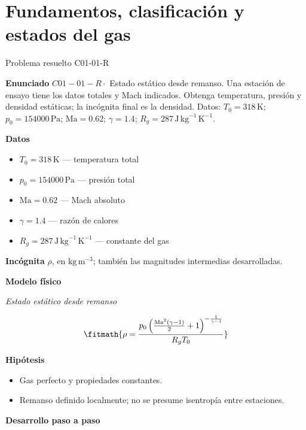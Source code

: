 \documentclass[10pt,openany]{book}
\begin{document}
\frontmatter
\studiumreadingguide
\tableofcontents
\mainmatter
\chapter{Fundamentos, clasificación y estados del gas}
\begin{studiumworked}{Problema resuelto C01-01-R}


\noindent\textbf{Enunciado}
\(C01-01-R \cdot\) Estado estático desde remanso. Una estación de ensayo tiene los datos totales y Mach indicados. Obtenga temperatura, presión y densidad estáticas; la incógnita final es la densidad. Datos: \(T_0=318\, \mathrm{K}\); \(p_0=154000\, \mathrm{Pa}\); \(\mathrm{Ma}=0.62\); \(\gamma=1.4\); \(R_g=287\, \mathrm{J}\,\mathrm{kg}^{-1}\,\mathrm{K}^{-1}\).

\noindent\textbf{Datos}
\begin{itemize}
\item $T_0 = 318\,\mathrm{K}$ — temperatura total
\item $p_0 = 154000\,\mathrm{Pa}$ — presión total
\item $\mathrm{Ma} = 0.62$ — Mach absoluto
\item $\gamma = 1.4$ — razón de calores
\item $R_g = 287\,\mathrm{J}\,\mathrm{kg}^{-1}\,\mathrm{K}^{-1}$ — constante del gas
\end{itemize}

\noindent\textbf{Incógnita}
$\rho$, en $\mathrm{kg\,m^{-3}}$; también las magnitudes intermedias desarrolladas.

\noindent\textbf{Modelo físico}

\noindent\textit{Estado estático desde remanso}

\[
\fitmath{\rho=\frac{p_0 \left(\frac{\mathrm{Ma}^{2} \left(\gamma - 1\right)}{2} + 1\right)^{- \frac{1}{\gamma - 1}}}{R_g T_0}}
\]

\noindent\textbf{Hipótesis}
\begin{itemize}
\item Gas perfecto y propiedades constantes.
\item Remanso definido localmente; no se presume isentropía entre estaciones.
\end{itemize}

\noindent\textbf{Desarrollo paso a paso}




\end{studiumworked}
\end{document}
